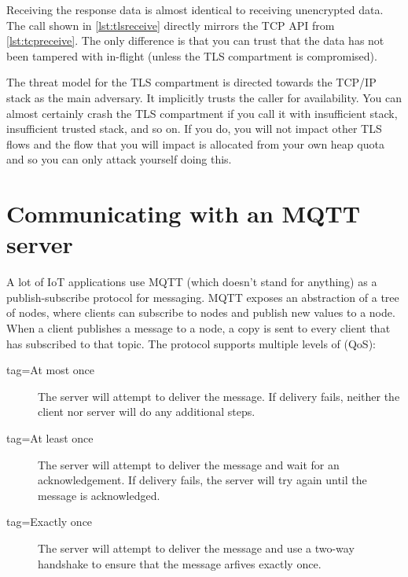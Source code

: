 \codelisting[filename=examples/tls/https.cc,marker=send,label=lst:tlssend,caption="Sending data over a TLS connection."]{}

Receiving the response data is almost identical to receiving unencrypted data.
The call shown in \ref{lst:tlsreceive} directly mirrors the TCP API from \ref{lst:tcpreceive}.
The only difference is that you can trust that the data has not been tampered with in-flight (unless the TLS compartment is compromised).

\codelisting[filename=examples/tls/https.cc,marker=receive,label=lst:tlsreceive,caption="Receiving data over a TLS connection."]{}

\begin{caution}
The threat model for the TLS compartment is directed towards the TCP/IP stack as the main adversary.
It implicitly trusts the caller for availability.
You can almost certainly crash the TLS compartment if you call it with insufficient stack, insufficient trusted stack, and so on.
If you do, you will not impact other TLS flows and the flow that you will impact is allocated from your own heap quota and so you can only attack yourself doing this.
\end{caution}

\section[label=mqtt]{Communicating with an MQTT server}

A lot of IoT applications use MQTT (which doesn't stand for anything) as a publish-subscribe protocol for messaging.
MQTT exposes an abstraction of a tree of nodes, where clients can subscribe to nodes and publish new values to a node.
When a client publishes a message to a node, a copy is sent to every client that has subscribed to that topic.
The protocol supports multiple levels of  (QoS):

\begin{description}
\item[tag=At most once]{The server will attempt to deliver the message.
	If delivery fails, neither the client nor server will do any additional steps.}
\item[tag=At least once]{The server will attempt to deliver the message and wait for an acknowledgement.
	If delivery fails, the server will try again until the message is acknowledged.}
\item[tag=Exactly once]{The server will attempt to deliver the message and use a two-way handshake to ensure that the message arfives exactly once.}
\end{description}

